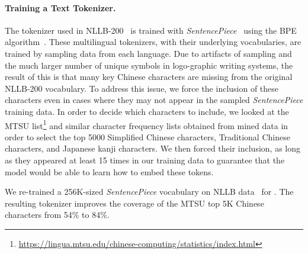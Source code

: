 \paragraph{Training a Text Tokenizer.}
The tokenizer used in NLLB-200~\citep{nllb2022} is trained with \textit{SentencePiece}~\citep{sentencepiece} using the BPE algorithm~\citep{gage1994new,sennrich-etal-2016-neural}. 
These multilingual tokenizers, with their underlying vocabularies, are trained by sampling data from each language. Due to artifacts of sampling and the much larger number of unique symbols in logo-graphic writing systems, the result of this is that many key Chinese characters are missing from the original NLLB-200 vocabulary. To address this issue, we force the inclusion of these characters even in cases where they may not appear in the sampled \textit{SentencePiece} training data.
In order to decide which characters to include, we looked at the MTSU list\footnote{\url{https://lingua.mtsu.edu/chinese-computing/statistics/index.html}} and similar character frequency lists obtained from mined data in order to select the top 5000 Simplified Chinese characters, Traditional Chinese characters, and Japanese kanji characters. We then forced their inclusion, as long as they appeared at least 15 times in our training data to guarantee that the model would be able to learn how to embed these tokens.

We re-trained a 256K-sized \textit{SentencePiece} vocabulary on NLLB data~\citep{nllb2022} for \mfourt. The resulting tokenizer improves the coverage of the MTSU top 5K Chinese characters from 54\% to 84\%.

